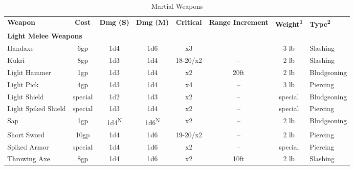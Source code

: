 \begin{table}[htb]
\mcinherit
\caption{Martial Weapons}
\centering
\begin{tabular}{l c c c c c c l}
\textbf{Weapon} & \textbf{Cost} & \textbf{Dmg (S)} & \textbf{Dmg (M)} & \textbf{Critical} & \multicolumn{1}{p{1.7cm}}{\textbf{Range \hspace{7pt} Increment}} & \textbf{Weight\textsuperscript{1}} & \textbf{Type\textsuperscript{2}}\\

\multicolumn{8}{l}{\textbf{Light Melee Weapons}}\\
\hspace{.5cm}Handaxe & 6gp & 1d4 & 1d6 & x3 & -- & 3 lb & Slashing\\
\hspace{.5cm}Kukri & 8gp & 1d3 & 1d4 & 18-20/x2 & -- & 2 lb & Slashing\\
\hspace{.5cm}Light Hammer & 1gp & 1d3 & 1d4 & x2 & 20ft & 2 lb & Bludgeoning\\
\hspace{.5cm}Light Pick & 4gp & 1d3 & 1d4 & x4 & -- & 3 lb & Piercing\\
\hspace{.5cm}Light Shield & special & 1d2 & 1d3 & x2 & -- & special & Bludgeoning\\
\hspace{.5cm}Light Spiked Shield & special & 1d3 & 1d4 & x2 & -- & special & Piercing\\
\hspace{.5cm}Sap & 1gp & 1d4\textsuperscript{N} & 1d6\textsuperscript{N} & x2 & -- & 2 lb & Bludgeoning\\
\hspace{.5cm}Short Sword & 10gp & 1d4 & 1d6 & 19-20/x2 & -- & 2 lb & Piercing\\
\hspace{.5cm}Spiked Armor & special & 1d4 & 1d6 & x2 & -- & special & Piercing\\
\hspace{.5cm}Throwing Axe & 8gp & 1d4 & 1d6 & x2 & 10ft & 2 lb & Slashing\\


\end{tabular}
\end{table}
